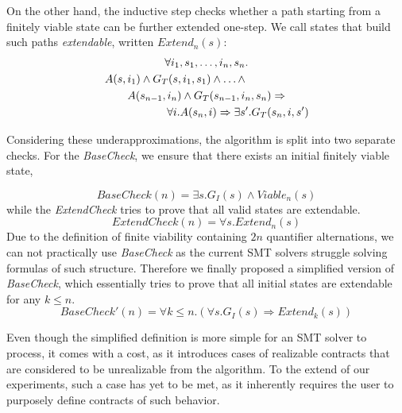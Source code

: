 On the other hand, the inductive step checks whether a path starting from a
finitely viable state can be further extended one-step. We call states that
build such paths \textit{extendable}, written $Extend_{n}(s)$:
	\begin{multline}
	\label{ml:extendable}
		\forall i_1,s_1,\ldots,i_n,s_n. \\
		\hspace{-2cm} A(s,i_1) \wedge G_T(s,i_1,s_1) \wedge \ldots \wedge \\
		A(s_{n-1}, i_n) \wedge G_T(s_{n-1},i_n,s_n) \Rightarrow \\
		\hspace{+2cm} \forall i. A(s_n,i) \Rightarrow \exists s'. G_T(s_n,i,s')
	\end{multline}
	
Considering these underapproximations, the algorithm is split into two separate
checks. For the \textit{BaseCheck}, we ensure that there exists an initial
finitely viable state,


\begin{equation}
\label{bcheck}
BaseCheck(n) = \exists s. G_I(s) \wedge Viable_n(s)
\end{equation}
while the \textit{ExtendCheck} tries to prove that all
valid states are extendable.
\begin{equation}
\label{eq:echeck}
ExtendCheck(n) = \forall s. Extend_n(s)
\end{equation}
Due to the definition of finite viability containing $2n$
quantifier alternations, we can not practically use \textit{BaseCheck} as the
current SMT solvers struggle solving formulas of such structure. Therefore we
finally proposed a simplified version of \textit{BaseCheck}, which essentially
tries to prove that all initial states are extendable for any $k \leq n$.
\begin{equation}
\label{eq:sbcheck}
BaseCheck'(n) = \forall k \leq n. (\forall s. G_I(s)
	  	\Rightarrow Extend_k(s))
\end{equation}

Even though the simplified definition is more simple for an SMT solver to
process, it comes with a cost, as it introduces cases of realizable contracts
that are considered to be unrealizable from the algorithm. To the extend of our
experiments, such a case has yet to be met, as it inherently requires the user
to purposely define contracts of such behavior.

